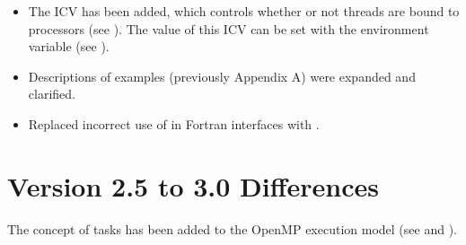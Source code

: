 \begin{itemize}
\item The  ICV has been added, which controls whether or not threads are bound
to processors (see
).
The value of this ICV can be set with
the  environment variable (see
).

\item Descriptions of examples (previously Appendix A) were expanded and
clarified.

\item Replaced incorrect use of  in Fortran interfaces with
.
\end{itemize}







\section{Version 2.5 to 3.0 Differences}
\label{sec:Version 2.5 to 3.0 Differences}
The concept of tasks has been added to the OpenMP execution model (see
 and
).

